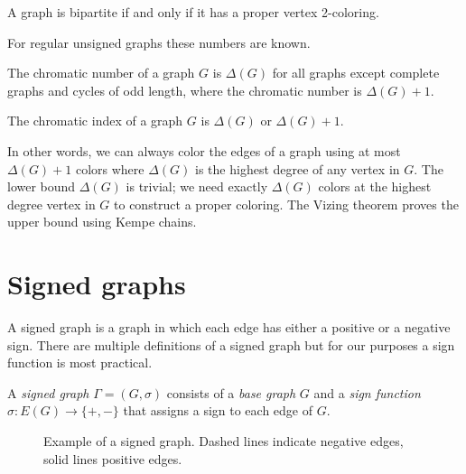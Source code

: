 \begin{theorem}\label{th:bipartite}
    A graph is bipartite if and only if it has a proper vertex 2-coloring.
\end{theorem}

For regular unsigned graphs these numbers are known.

\begin{theorem}[Brooks]
    The chromatic number of a graph $G$ is $\Delta(G)$ for all graphs except complete graphs and cycles of odd length, where the chromatic number is $\Delta(G) + 1$.\cite{brooks}
\end{theorem}

\begin{theorem}[Vizing]
    The chromatic index of a graph $G$ is $\Delta(G)$ or $\Delta(G) + 1$.
\end{theorem}

In other words, we can always color the edges of a graph using at most $\Delta(G) + 1$ colors where $\Delta(G)$ is the highest degree of any vertex in $G$. The lower bound $\Delta(G)$ is trivial; we need exactly $\Delta(G)$ colors at the highest degree vertex in $G$ to construct a proper coloring. The Vizing theorem proves the upper bound using Kempe chains.

\section{Signed graphs}

A signed graph is a graph in which each edge has either a positive or a negative sign. There are multiple definitions of a signed graph but for our purposes a sign function is most practical.

\begin{definition}
    A \textit{signed graph} $\Gamma = (G, \sigma)$ consists of a \textit{base graph} $G$ and a \textit{sign function} $\sigma : E(G) \rightarrow \{+,-\}$ that assigns a sign to each edge of $G$.
\end{definition}

\begin{figure}[h]
    \centering
    \caption[Example of a signed graph]{Example of a signed graph. Dashed lines indicate negative edges, solid lines positive edges.}
\end{figure}

